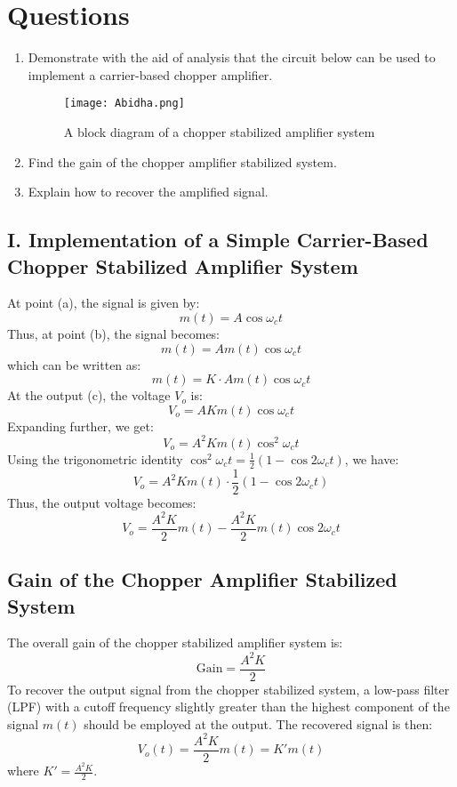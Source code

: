 \documentclass[a4paper,9pt,twoside,openany,twocolumn]{memoir}
\begin{document}
\section{Questions}
\begin{enumerate}
    \item Demonstrate with the aid of analysis that the circuit below can be used to implement a carrier-based chopper amplifier.
\begin{figure}[h]
    \centering
    \texttt{[image: Abidha.png]}
    \caption{A block diagram of a chopper stabilized amplifier system}
\end{figure}
    \item Find the gain of the chopper amplifier stabilized system.
    \item Explain how to recover the amplified signal.
\end{enumerate}



\subsection*{I. Implementation of a Simple Carrier-Based Chopper Stabilized Amplifier System}

At point (a), the signal is given by:
\[
m(t) = A \cos \omega_c t
\]
Thus, at point (b), the signal becomes:
\[
m(t) = A m(t) \cos \omega_c t
\]
which can be written as:
\[
m(t) = K \cdot A m(t) \cos \omega_c t
\]
At the output (c), the voltage $V_o$ is:
\[
V_o = A K m(t) \cos \omega_c t
\]
Expanding further, we get:
\[
V_o = A^2 K m(t) \cos^2 \omega_c t
\]
Using the trigonometric identity $\cos^2 \omega_c t = \frac{1}{2} (1 - \cos 2 \omega_c t)$, we have:
\[
V_o = A^2 K m(t) \cdot \frac{1}{2} (1 - \cos 2 \omega_c t)
\]
Thus, the output voltage becomes:
\[
V_o = \frac{A^2 K}{2} m(t) - \frac{A^2 K}{2} m(t) \cos 2 \omega_c t
\]

\subsection{Gain of the Chopper Amplifier Stabilized System}
The overall gain of the chopper stabilized amplifier system is:
\[
\text{Gain} = \frac{A^2 K}{2}
\]
To recover the output signal from the chopper stabilized system, a low-pass filter (LPF) with a cutoff frequency slightly greater than the highest component of the signal $m(t)$ should be employed at the output. The recovered signal is then:
\[
V_o(t) = \frac{A^2 K}{2} m(t) = K' m(t)
\]
where \( K' = \frac{A^2 K}{2} \).
\end{document}
